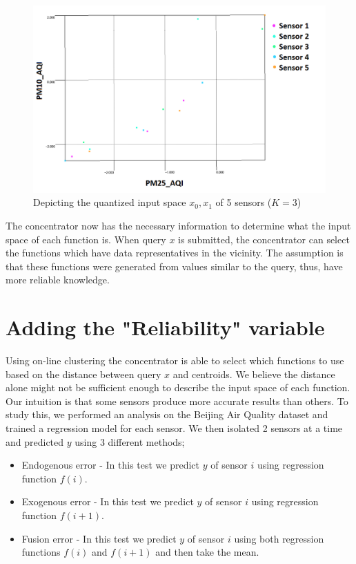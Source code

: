 \documentclass{mproj}
\begin{document}
\begin{figure}[H]
\caption{Depicting the quantized input space $x_0,x_1$ of 5 sensors ($K=3$)}
\label{fig:clusters53knn}
\centerline{\includegraphics[scale=0.7]{clusters5sensors3knn}}
\end{figure}

The concentrator now has the necessary information to determine what the input space of each function is. When query $x$ is submitted, the concentrator can select the functions which have data representatives in the vicinity. The assumption is that these functions were generated from values similar to the query, thus, have more reliable knowledge.

\section{Adding the "Reliability" variable}
\label{sec:reliabilityVariable}
Using on-line clustering the concentrator is able to select which functions to use based on the distance between query $x$ and centroids. We believe the distance alone might not be sufficient enough to describe the input space of each function. Our intuition is that some sensors produce more accurate results than others. To study this, we performed an analysis on the Beijing Air Quality dataset \cite{air-quality-inference-meets-big-data} and trained a regression model for each sensor. We then isolated 2 sensors at a time and predicted $y$ using 3 different methods; 

\begin{itemize}  
\item Endogenous error - In this test we predict $y$ of sensor $i$ using regression function $f(i)$.
\item Exogenous error - In this test we predict $y$ of sensor $i$ using regression function $f(i+1)$.
\item Fusion error - In this test we predict $y$ of sensor $i$ using both regression functions $f(i)$ and $f(i+1)$ and then take the mean.
\end{itemize}
\end{document}
